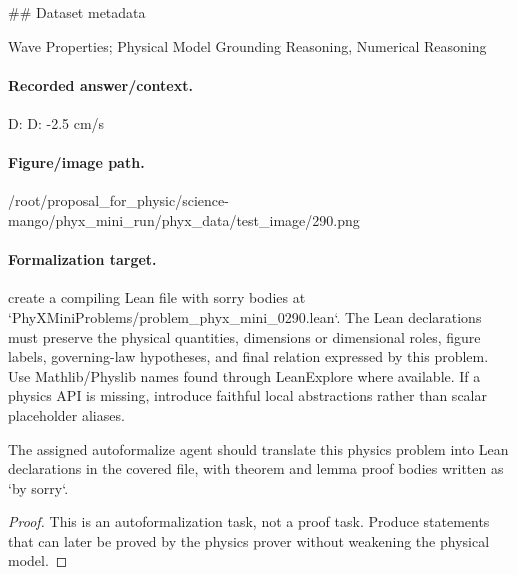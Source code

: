\#\# Dataset metadata

Wave Properties; Physical Model Grounding Reasoning, Numerical Reasoning

\paragraph{Recorded answer/context.}
D: D: -2.5 cm/s

\paragraph{Figure/image path.}
/root/proposal\_for\_physic/science-mango/phyx\_mini\_run/phyx\_data/test\_image/290.png

\paragraph{Formalization target.}
create a compiling Lean file with sorry bodies at `PhyXMiniProblems/problem\_phyx\_mini\_0290.lean`. The Lean declarations must preserve the physical quantities, dimensions or dimensional roles, figure labels, governing-law hypotheses, and final relation expressed by this problem.
Use Mathlib/Physlib names found through LeanExplore where available. If a physics API is missing, introduce faithful local abstractions rather than scalar placeholder aliases.

\begin{theorem}
\label{thm:physics:phyx_mini_0290:target}
The assigned autoformalize agent should translate this physics problem into Lean declarations in the covered file, with theorem and lemma proof bodies written as `by sorry`.
\end{theorem}
\begin{proof}
This is an autoformalization task, not a proof task. Produce statements that can later be proved by the physics prover without weakening the physical model.
\end{proof}

